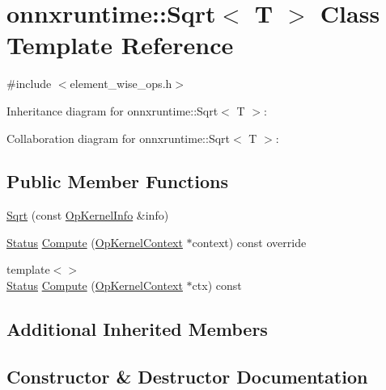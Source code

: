 \hypertarget{classonnxruntime_1_1Sqrt}{}\section{onnxruntime\+:\+:Sqrt$<$ T $>$ Class Template Reference}
\label{classonnxruntime_1_1Sqrt}


{\ttfamily \#include $<$element\+\_\+wise\+\_\+ops.\+h$>$}



Inheritance diagram for onnxruntime\+:\+:Sqrt$<$ T $>$\+:


Collaboration diagram for onnxruntime\+:\+:Sqrt$<$ T $>$\+:
\subsection*{Public Member Functions}
\begin{DoxyCompactItemize}
\item 
\mbox{\hyperlink{classonnxruntime_1_1Sqrt_aad6b4322a4ce74bd3f9125966fa917ad}{Sqrt}} (const \mbox{\hyperlink{classonnxruntime_1_1OpKernelInfo}{Op\+Kernel\+Info}} \&info)
\item 
\mbox{\hyperlink{classonnxruntime_1_1common_1_1Status}{Status}} \mbox{\hyperlink{classonnxruntime_1_1Sqrt_a12ddb9274f4ecd6407dfc9f078ef1b40}{Compute}} (\mbox{\hyperlink{classonnxruntime_1_1OpKernelContext}{Op\+Kernel\+Context}} $\ast$context) const override
\item 
{\footnotesize template$<$$>$ }\\\mbox{\hyperlink{classonnxruntime_1_1common_1_1Status}{Status}} \mbox{\hyperlink{classonnxruntime_1_1Sqrt_a85dc8d7f5eb34c65f6e0a1ea005f2fb5}{Compute}} (\mbox{\hyperlink{classonnxruntime_1_1OpKernelContext}{Op\+Kernel\+Context}} $\ast$ctx) const
\end{DoxyCompactItemize}
\subsection*{Additional Inherited Members}


\subsection{Constructor \& Destructor Documentation}
\mbox{\label{classonnxruntime_1_1Sqrt_aad6b4322a4ce74bd3f9125966fa917ad}} 
